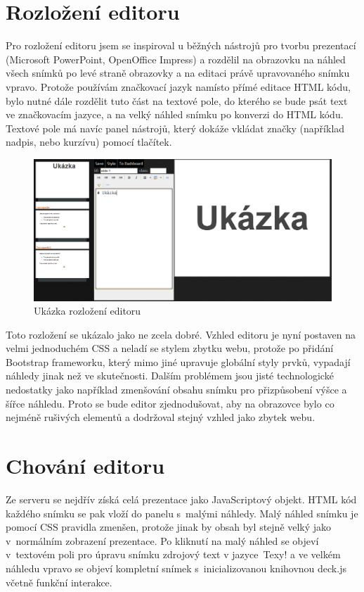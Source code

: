 \documentclass[11pt,twoside,a4paper]{book}
\begin{document}
\section{Rozložení editoru}
Pro rozložení editoru jsem se inspiroval u běžných nástrojů pro tvorbu prezentací (Microsoft PowerPoint, OpenOffice
Impress) a rozdělil na obrazovku na náhled všech snímků po levé straně obrazovky a na editaci právě upravovaného snímku
vpravo. Protože používám značkovací jazyk namísto přímé editace HTML kódu, bylo nutné dále rozdělit tuto část na
textové pole, do kterého se bude psát text ve značkovacím jazyce, a na velký náhled snímku po konverzi do HTML kódu.
Textové pole má navíc panel nástrojů, který dokáže vkládat značky (například nadpis, nebo kurzívu) pomocí tlačítek.

\begin{figure}[ht]
	\begin{center}
		\includegraphics[width=14cm]{PRO-img/editor.png}
		\caption{Ukázka rozložení editoru}
		\label{fig:editorLayout}
	\end{center}
\end{figure}

Toto rozložení se ukázalo jako ne zcela dobré. Vzhled editoru je nyní postaven na velmi jednoduchém CSS a neladí se
stylem zbytku webu, protože po přidání Bootstrap frameworku, který mimo jiné upravuje globální styly prvků, vypadají
náhledy jinak než ve skutečnosti. Dalším problémem jsou jisté technologické nedostatky jako například zmenšování obsahu
snímku pro přizpůsobení výšce a šířce náhledu. Proto se bude editor zjednodušovat, aby na obrazovce bylo co nejméně
rušivých elementů a dodržoval stejný vzhled jako zbytek webu.


\section[Chování editoru]{Chování editoru}
Ze serveru se nejdřív získá celá prezentace jako JavaScriptový objekt. HTML kód každého snímku se pak vloží do panelu
s~malými náhledy. Malý náhled snímku je pomocí CSS pravidla zmenšen, protože jinak by obsah byl stejně velký jako
v~normálním zobrazení prezentace. Po kliknutí na malý náhled se objeví v~textovém poli pro úpravu snímku zdrojový text
v jazyce~Texy! a ve velkém náhledu vpravo se objeví kompletní snímek s~inicializovanou knihovnou deck.js včetně funkční
interakce.
\end{document}
